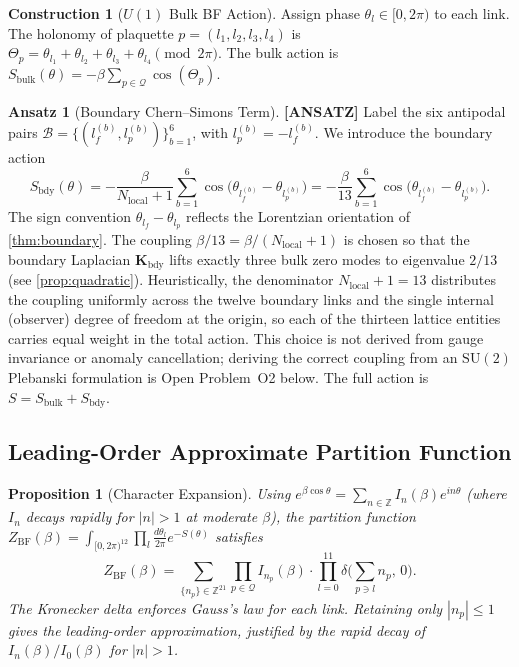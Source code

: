 \documentclass[12pt, a4paper]{article}
\theoremstyle{plain}
\newtheorem{proposition}[theorem]{Proposition}
\theoremstyle{definition}
\newtheorem{construction}[theorem]{Construction}
\newtheorem{ansatz}[theorem]{Ansatz}
\theoremstyle{remark}
\newcommand{\Plaq}{\mathcal{Q}}
\newcommand{\Nloc}{N_{\mathrm{local}}}
\newcommand{\Kmat}{\mathbf{K}}
\newcommand{\Z}{\mathbb{Z}}
\newcommand{\ZBF}{Z_{\mathrm{BF}}}
\newcommand{\ANSATZ}{\textcolor{ansatzblue}{\textbf{[ANSATZ]}}}
\begin{document}
\begin{construction}[$U(1)$ Bulk BF Action]\label{con:BF}
Assign phase $\theta_l\in[0,2\pi)$ to each link.
The holonomy of plaquette $p=(l_1,l_2,l_3,l_4)$ is
$\Theta_p = \theta_{l_1}+\theta_{l_2}+\theta_{l_3}+\theta_{l_4}
\pmod{2\pi}$.
The bulk action is
$S_\mathrm{bulk}(\theta) = -\beta\sum_{p\in\Plaq}\cos(\Theta_p)$.
\end{construction}

\begin{ansatz}[Boundary Chern--Simons Term]\label{ans:bdy}
\ANSATZ\;
Label the six antipodal pairs
$\mathcal{B} = \{(l_f^{(b)}, l_p^{(b)})\}_{b=1}^6$,
with $l_p^{(b)} = -l_f^{(b)}$.
We introduce the boundary action
\[
  S_\mathrm{bdy}(\theta)
  = -\frac{\beta}{\Nloc+1}
    \sum_{b=1}^6
    \cos\!\bigl(\theta_{l_f^{(b)}} - \theta_{l_p^{(b)}}\bigr)
  = -\frac{\beta}{13}
    \sum_{b=1}^6
    \cos\!\bigl(\theta_{l_f^{(b)}} - \theta_{l_p^{(b)}}\bigr).
\]
The sign convention $\theta_{l_f}-\theta_{l_p}$ reflects the
Lorentzian orientation of \cref{thm:boundary}.
The coupling $\beta/13 = \beta/(\Nloc+1)$ is chosen so that
the boundary Laplacian $\Kmat_\mathrm{bdy}$ lifts exactly three
bulk zero modes to eigenvalue $2/13$ (see \cref{prop:quadratic}).
Heuristically, the denominator $\Nloc + 1 = 13$ distributes
the coupling uniformly across the twelve boundary links and the
single internal (observer) degree of freedom at the origin, so
each of the thirteen lattice entities carries equal weight
in the total action.
This choice is not derived from gauge invariance or anomaly
cancellation; deriving the correct coupling from an $\mathrm{SU}(2)$
Plebanski formulation is Open Problem~O2 below.
The full action is $S = S_\mathrm{bulk} + S_\mathrm{bdy}$.
\end{ansatz}

\subsection{Leading-Order Approximate Partition Function}

\begin{proposition}[Character Expansion]\label{prop:character}
Using $e^{\beta\cos\theta} = \sum_{n\in\Z} I_n(\beta)e^{in\theta}$
(where $I_n$ decays rapidly for $|n|>1$ at moderate $\beta$),
the partition function
$\ZBF(\beta) = \int_{[0,2\pi)^{12}}\prod_l \frac{d\theta_l}{2\pi}
e^{-S(\theta)}$
satisfies
\begin{equation}
  \ZBF(\beta) = \sum_{\{n_p\}\in\Z^{21}}
  \prod_{p\in\Plaq} I_{n_p}(\beta)\cdot
  \prod_{l=0}^{11}
  \delta\!\bigl(\textstyle\sum_{p\ni l} n_p,\,0\bigr).
  \label{eq:Zchar}
\end{equation}
The Kronecker delta enforces Gauss's law for each link.
Retaining only $|n_p|\leq1$ gives the leading-order approximation,
justified by the rapid decay of $I_n(\beta)/I_0(\beta)$ for
$|n|>1$.
\end{proposition}
\end{document}
